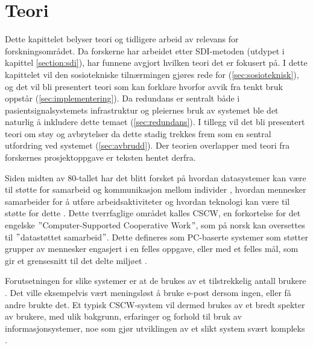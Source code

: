 \chapter{Teori}
\label{chp:teori} 
Dette kapittelet belyser teori og tidligere arbeid av relevans for forskningsområdet. Da forskerne har arbeidet etter SDI-metoden (utdypet i kapittel \ref{section:sdi}), har funnene avgjort hvilken teori det er fokusert på. I dette kapittelet vil den sosiotekniske tilnærmingen gjøres rede for (\ref{sec:sosioteknisk}), og det vil bli presentert teori som kan forklare hvorfor avvik fra tenkt bruk oppstår (\ref{sec:implementering}). Da redundans er sentralt både i pasientsignalsystemets infrastruktur og pleiernes bruk av systemet ble det naturlig å inkludere dette temaet (\ref{sec:redundans}). I tillegg vil det bli presentert teori om støy og avbrytelser da dette stadig trekkes frem som en sentral utfordring ved systemet (\ref{sec:avbrudd}). Der teorien overlapper med teori fra forskernes prosjektoppgave \citep{Sund13} er teksten hentet derfra. 

\noindent
Siden midten av 80-tallet har det blitt forsket på hvordan datasystemer kan være til støtte for samarbeid og kommunikasjon mellom individer \citep{Rogers94}, hvordan mennesker samarbeider for å utføre arbeidsaktiviteter og hvordan teknologi kan være til støtte for dette \citep{Ellis91}. Dette tverrfaglige området kalles CSCW, en forkortelse for det engelske $"$Computer-Supported Cooperative Work$"$, som på norsk kan oversettes til $"$datastøttet samarbeid$"$. Dette defineres som PC-baserte systemer som støtter grupper av mennesker engasjert i en felles oppgave, eller med et felles mål, som gir et grensesnitt til det delte miljøet \citep{Ellis91}.

\noindent
Forutsetningen for slike systemer er at de brukes av et tilstrekkelig antall brukere \citep{Ackermann00}. Det ville eksempelvis vært meningsløst å bruke e-post dersom ingen, eller få andre brukte det. Et typisk CSCW-system vil dermed brukes av et bredt spekter av brukere, med ulik bakgrunn, erfaringer og forhold til bruk av informasjonsystemer, noe som gjør utviklingen av et slikt system svært kompleks \citep{Berg99}.